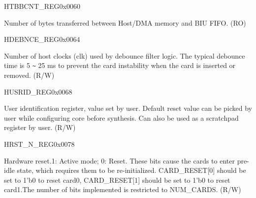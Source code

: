 \begin{register}{H}{TBBCNT\_REG}{0x0060}\label{regdesc:TBBCNTREG}
%
\regnewline%
\begin{regdesc}\begin{reglist}
\item [TBBCNT\_REG]Number of bytes transferred between Host/DMA memory and BIU FIFO. (RO)
\end{reglist}\end{regdesc}
\end{register}


\begin{register}{H}{DEBNCE\_REG}{0x0064}\label{regdesc:DEBNCEREG}
%
%
\regnewline%
\begin{regdesc}\begin{reglist}
\item [DEBOUNCE\_COUNT]Number of host clocks (clk) used by debounce filter logic. The typical debounce time is 5 \verb+~+ 25 ms to prevent the card instability when the card is inserted or removed. (R/W)
\end{reglist}\end{regdesc}
\end{register}


\begin{register}{H}{USRID\_REG}{0x0068}\label{regdesc:USRIDREG}
%
\regnewline%
\begin{regdesc}\begin{reglist}
\item [USRID\_REG]User identification register, value set by user. Default reset value can be picked by user while configuring core before synthesis. Can also be used as a scratchpad register by user. (R/W)
\end{reglist}\end{regdesc}
\end{register}


\begin{register}{H}{RST\_N\_REG}{0x0078}\label{regdesc:RSTNREG}
%
%
\regnewline%
\begin{regdesc}\begin{reglist}
\item [RST\_CARD\_RESET]Hardware reset.1: Active mode; 0: Reset. These bits cause the cards to enter pre-idle state, which requires them to be re-initialized. CARD\_RESET[0] should be set to 1'b0 to reset card0, CARD\_RESET[1] should be set to 1'b0 to reset card1.The number of bits implemented is restricted to NUM\_CARDS. (R/W)
\end{reglist}\end{regdesc}
\end{register}


